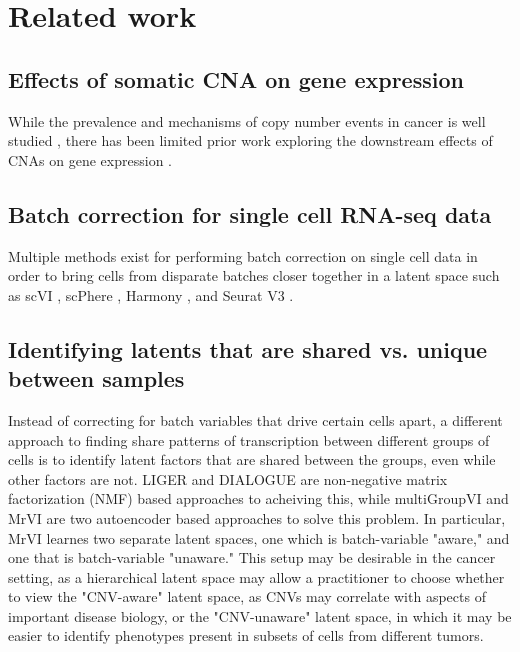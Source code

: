 \documentclass{article}
\begin{document}
\section{Related work}
\subsection{Effects of somatic CNA on gene expression}
While the prevalence and mechanisms of copy number events in cancer is well studied \citep{hastings2009mechanisms}, there has been limited prior work exploring the downstream effects of CNAs on gene expression \citep{shao2019copy, bhattacharya2020transcriptional}.

\subsection{Batch correction for single cell RNA-seq data}
Multiple methods exist for performing batch correction on single cell data in order to bring cells from disparate batches closer together in a latent space such as scVI \citep{lopez2018deep}, scPhere \citep{ding2021deep}, Harmony \citep{korsunsky2019fast}, and Seurat V3 \citep{stuart2019comprehensive}. 

\subsection{Identifying latents that are shared vs. unique between samples}
Instead of correcting for batch variables that drive certain cells apart, a different approach to finding share patterns of transcription between different groups of cells is to identify latent factors that are shared between the groups, even while other factors are not. LIGER \citep{welch2019single} and DIALOGUE \citep{jerby2022dialogue} are non-negative matrix factorization (NMF) based approaches to acheiving this, while multiGroupVI \citep{weinberger2022disentangling} and MrVI \citep{boyeau2022deep} are two autoencoder based approaches to solve this problem. In particular, MrVI learnes two separate latent spaces, one which is batch-variable "aware," and one that is batch-variable "unaware." This setup may be desirable in the cancer setting, as a hierarchical latent space may allow a practitioner to choose whether to view the "CNV-aware" latent space, as CNVs may correlate with aspects of important disease biology, or the "CNV-unaware" latent space, in which it may be easier to identify phenotypes present in subsets of cells from different tumors.
\end{document}
